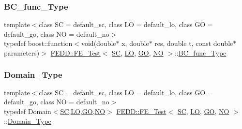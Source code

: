 \mbox{\label{classFEDD_1_1FE__Test_a1ac70a79e5935320b05ecf16739ad8a4}} 
\subsubsection{\texorpdfstring{B\+C\+\_\+func\+\_\+\+Type}{BC\_func\_Type}}
{\footnotesize\ttfamily template$<$class SC  = default\+\_\+sc, class LO  = default\+\_\+lo, class GO  = default\+\_\+go, class NO  = default\+\_\+no$>$ \\
typedef boost\+::function$<$void(double$\ast$ x, double$\ast$ res, double t, const double$\ast$ parameters)$>$ \hyperlink{classFEDD_1_1FE__Test}{F\+E\+D\+D\+::\+F\+E\+\_\+\+Test}$<$ \hyperlink{fe__test__laplace_8cpp_a79c7e86a57edbb2a5a53242bcd04e41e}{SC}, \hyperlink{fe__test__laplace_8cpp_ad6a38c9f07d3fd633eefca5bccad8410}{LO}, \hyperlink{fe__test__laplace_8cpp_afa2946b509009b4f45eb04bd8c5b27d9}{GO}, \hyperlink{fe__test__laplace_8cpp_a5e24f37b28787429872b6ecb1d0417ce}{NO} $>$\+::\hyperlink{classFEDD_1_1FE__Test_a1ac70a79e5935320b05ecf16739ad8a4}{B\+C\+\_\+func\+\_\+\+Type}}

\mbox{\label{classFEDD_1_1FE__Test_a5e414af507a141db0961c32bf6b19825}} 
\subsubsection{\texorpdfstring{Domain\+\_\+\+Type}{Domain\_Type}}
{\footnotesize\ttfamily template$<$class SC  = default\+\_\+sc, class LO  = default\+\_\+lo, class GO  = default\+\_\+go, class NO  = default\+\_\+no$>$ \\
typedef Domain$<$\hyperlink{fe__test__laplace_8cpp_a79c7e86a57edbb2a5a53242bcd04e41e}{SC},\hyperlink{fe__test__laplace_8cpp_ad6a38c9f07d3fd633eefca5bccad8410}{LO},\hyperlink{fe__test__laplace_8cpp_afa2946b509009b4f45eb04bd8c5b27d9}{GO},\hyperlink{fe__test__laplace_8cpp_a5e24f37b28787429872b6ecb1d0417ce}{NO}$>$ \hyperlink{classFEDD_1_1FE__Test}{F\+E\+D\+D\+::\+F\+E\+\_\+\+Test}$<$ \hyperlink{fe__test__laplace_8cpp_a79c7e86a57edbb2a5a53242bcd04e41e}{SC}, \hyperlink{fe__test__laplace_8cpp_ad6a38c9f07d3fd633eefca5bccad8410}{LO}, \hyperlink{fe__test__laplace_8cpp_afa2946b509009b4f45eb04bd8c5b27d9}{GO}, \hyperlink{fe__test__laplace_8cpp_a5e24f37b28787429872b6ecb1d0417ce}{NO} $>$\+::\hyperlink{classFEDD_1_1FE__Test_a5e414af507a141db0961c32bf6b19825}{Domain\+\_\+\+Type}}


